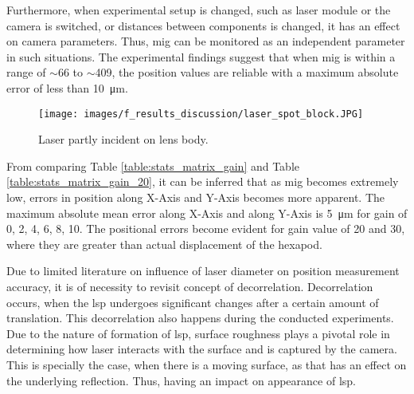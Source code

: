 \vspace{5mm}
\noindent Furthermore, when experimental setup is changed, such as laser module or the camera is switched, or distances between components is changed, it has an effect on camera parameters. Thus, \gls{mig} can be monitored as an independent parameter in such situations. The experimental findings suggest that when \gls{mig} is within a range of $\sim$66 to $\sim$409, the position values are reliable with a maximum absolute error of less than \SI{10}{\micro\meter}.

\vspace{5mm}

\begin{figure}[h]
    \centering
    \texttt{[image: images/f\_results\_discussion/laser\_spot\_block.JPG]}
    \caption{Laser partly incident on lens body.}
    \label{fig:laser_spot_block.JPG}
\end{figure}

\vspace{10mm}
\noindent From comparing Table \ref{table:stats_matrix_gain} and Table \ref{table:stats_matrix_gain_20}, it can be inferred that as \gls{mig} becomes extremely low, errors in position along X-Axis and Y-Axis becomes more apparent. The maximum absolute mean error along X-Axis and along Y-Axis is \SI{5}{\micro\meter} for gain of 0, 2, 4, 6, 8, 10. The positional errors become evident for gain value of 20 and 30, where they are greater than actual displacement of the hexapod.


\noindent Due to limited literature on influence of laser diameter on position measurement accuracy, it is of necessity to revisit concept of decorrelation. Decorrelation occurs, when the \gls{lsp} undergoes significant changes after a certain amount of translation. This decorrelation also happens during the conducted experiments. Due to the nature of formation of \gls{lsp}, surface roughness plays a pivotal role in determining how laser interacts with the surface and is captured by the camera. This is specially the case, when there is a moving surface, as that has an effect on the underlying reflection. Thus, having an impact on appearance of \gls{lsp}. 